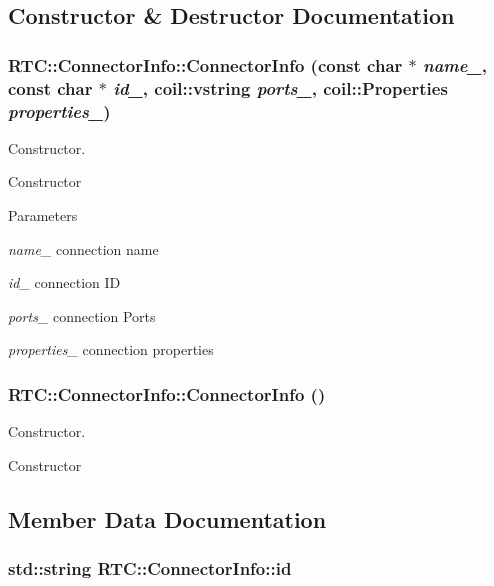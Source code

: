 \subsection{Constructor \& Destructor Documentation}
\subsubsection[{ConnectorInfo}]{\setlength{\rightskip}{0pt plus 5cm}RTC::ConnectorInfo::ConnectorInfo (const char $\ast$ {\em name\_\-}, \/  const char $\ast$ {\em id\_\-}, \/  {\bf coil::vstring} {\em ports\_\-}, \/  {\bf coil::Properties} {\em properties\_\-})\hspace{0.3cm}{\ttfamily  [inline]}}\label{classRTC_1_1ConnectorInfo_af4d6c063f07b31ee3ee79028cffdf1f8}


Constructor. 

Constructor


\begin{DoxyParams}{Parameters}
\item[{\em name\_\-}]connection name \item[{\em id\_\-}]connection ID \item[{\em ports\_\-}]connection Ports \item[{\em properties\_\-}]connection properties \end{DoxyParams}
\subsubsection[{ConnectorInfo}]{\setlength{\rightskip}{0pt plus 5cm}RTC::ConnectorInfo::ConnectorInfo ()\hspace{0.3cm}{\ttfamily  [inline]}}\label{classRTC_1_1ConnectorInfo_a35326894f5367b961eadccf0e8da98c3}


Constructor. 

Constructor 

\subsection{Member Data Documentation}
\subsubsection[{id}]{\setlength{\rightskip}{0pt plus 5cm}std::string {\bf RTC::ConnectorInfo::id}}\label{classRTC_1_1ConnectorInfo_ab5bef6c4b11d73cc51d8949950a4e969}



